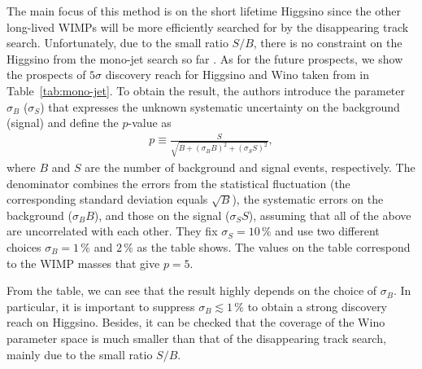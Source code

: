 \documentclass[12pt,twoside,book]{article}
\begin{document}
The main focus of this method is on the short lifetime Higgsino since the other long-lived WIMPs will be more efficiently searched for by the disappearing track search.
Unfortunately, due to the small ratio $S/B$, there is no constraint on the Higgsino from the mono-jet search so far \cite{Baer:2014cua}.
As for the future prospects, we show the prospects of $5\sigma$ discovery reach for Higgsino and Wino taken from \cite{Han:2018wus} in Table~\ref{tab:mono-jet}.
To obtain the result, the authors introduce the parameter $\sigma_B$ ($\sigma_S$) that expresses the unknown systematic uncertainty on the background (signal) and define the $p$-value as
\begin{align}
  p \equiv \frac{S}{\sqrt{B + (\sigma_B B)^2 + (\sigma_S S)^2}},
\end{align}
where $B$ and $S$ are the number of background and signal events, respectively.
The denominator combines the errors from the statistical fluctuation (the corresponding standard deviation equals $\sqrt{B}$), the systematic errors on the background ($\sigma_B B$), and those on the signal ($\sigma_S S$), assuming that all of the above are uncorrelated with each other.
They fix $\sigma_S = 10\,\%$ and use two different choices $\sigma_B = 1\,\%$ and $2\,\%$ as the table shows.
The values on the table correspond to the WIMP masses that give $p = 5$.

From the table, we can see that the result highly depends on the choice of $\sigma_B$.
In particular, it is important to suppress $\sigma_B \lesssim 1\, \%$ to obtain a strong discovery reach on Higgsino.
Besides, it can be checked that the coverage of the Wino parameter space is much smaller than that of the disappearing track search, mainly due to the small ratio $S/B$.


% 
% 
\end{document}
